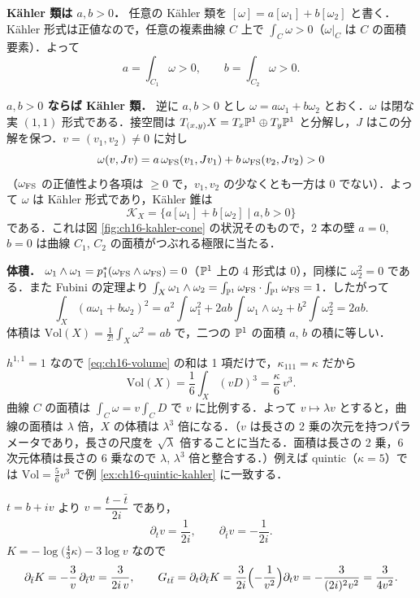 \textbf{K\"ahler 類は $a,b>0$．}
任意の K\"ahler 類を $[\omega]=a[\omega_1]+b[\omega_2]$ と書く．K\"ahler 形式は正値なので，任意の複素曲線 $C$ 上で $\int_C\omega>0$（$\omega|_C$ は $C$ の面積要素）．よって
\[
a=\int_{C_1}\omega>0,\qquad b=\int_{C_2}\omega>0 .
\]

\textbf{$a,b>0$ ならば K\"ahler 類．}
逆に $a,b>0$ とし $\omega=a\omega_1+b\omega_2$ とおく．$\omega$ は閉な実 $(1,1)$ 形式である．接空間は $T_{(x,y)}X=T_x\mathbb{P}^1\oplus T_y\mathbb{P}^1$ と分解し，$J$ はこの分解を保つ．$v=(v_1,v_2)\ne0$ に対し
\[
\omega(v,Jv)=a\,\omega_{\rm FS}(v_1,Jv_1)+b\,\omega_{\rm FS}(v_2,Jv_2)>0
\]
（$\omega_{\rm FS}$ の正値性より各項は $\ge0$ で，$v_1,v_2$ の少なくとも一方は $0$ でない）．よって $\omega$ は K\"ahler 形式であり，K\"ahler 錐は
\[
\mathcal{K}_X=\{a[\omega_1]+b[\omega_2]\mid a,b>0\}
\]
である．これは図 \ref{fig:ch16-kahler-cone} の状況そのもので，2 本の壁 $a=0$, $b=0$ は曲線 $C_1$, $C_2$ の面積がつぶれる極限に当たる．

\textbf{体積．}
$\omega_1\wedge\omega_1=p_1^*(\omega_{\rm FS}\wedge\omega_{\rm FS})=0$（$\mathbb{P}^1$ 上の 4 形式は $0$），同様に $\omega_2^2=0$ である．また Fubini の定理より $\int_X\omega_1\wedge\omega_2=\int_{\mathbb{P}^1}\omega_{\rm FS}\cdot\int_{\mathbb{P}^1}\omega_{\rm FS}=1$．したがって
\[
\int_X(a\omega_1+b\omega_2)^2=a^2\!\int\omega_1^2+2ab\!\int\omega_1\wedge\omega_2+b^2\!\int\omega_2^2=2ab .
\]
体積は $\mathrm{Vol}(X)=\frac1{2!}\int_X\omega^2=ab$ で，二つの $\mathbb{P}^1$ の面積 $a$, $b$ の積に等しい．

$h^{1,1}=1$ なので \eqref{eq:ch16-volume} の和は 1 項だけで，$\kappa_{111}=\kappa$ だから
\[
\mathrm{Vol}(X)=\frac16\int_X(vD)^3=\frac{\kappa}{6}\,v^3 .
\]
曲線 $C$ の面積は $\int_C\omega=v\int_CD$ で $v$ に比例する．よって $v\mapsto\lambda v$ とすると，曲線の面積は $\lambda$ 倍，$X$ の体積は $\lambda^3$ 倍になる．（$v$ は長さの 2 乗の次元を持つパラメータであり，長さの尺度を $\sqrt\lambda$ 倍することに当たる．面積は長さの 2 乗，6 次元体積は長さの 6 乗なので $\lambda$, $\lambda^3$ 倍と整合する．）例えば quintic（$\kappa=5$）では $\mathrm{Vol}=\tfrac56v^3$ で例 \ref{ex:ch16-quintic-kahler} に一致する．

$t=b+iv$ より $v=\dfrac{t-\bar t}{2i}$ であり，
\[
\partial_tv=\frac1{2i},\qquad \partial_{\bar t}v=-\frac1{2i}.
\]
$K=-\log\bigl(\tfrac43\kappa\bigr)-3\log v$ なので
\[
\partial_{\bar t}K=-\frac3v\,\partial_{\bar t}v=\frac{3}{2i\,v},\qquad
G_{t\bar t}=\partial_t\partial_{\bar t}K=\frac{3}{2i}\Bigl(-\frac1{v^2}\Bigr)\partial_tv=-\frac{3}{(2i)^2v^2}=\frac{3}{4v^2}.
\]

